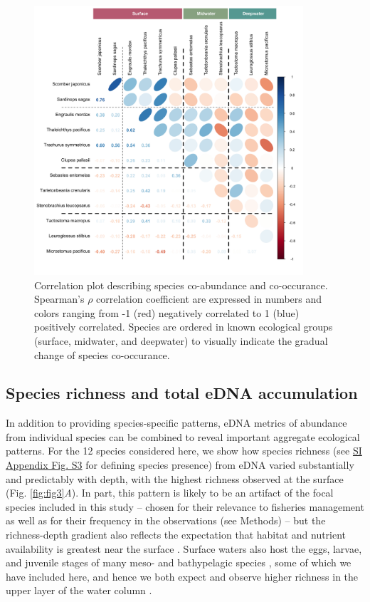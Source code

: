 \documentclass{article}
\begin{document}
\begin{figure}[tbhp] 
\centering
\includegraphics[width=10cm]{plots/2_Figure_2.jpg}  
\caption{Correlation plot describing species co-abundance and co-occurance. Spearman’s $\rho$ correlation coefficient are expressed in numbers and colors ranging from -1 (red) negatively correlated to 1 (blue) positively correlated. Species are ordered in known ecological groups (surface, midwater, and deepwater) to visually indicate the gradual change of species co-occurance.}
\label{fig:fig2}
\end{figure}

\subsection*{Species richness and total eDNA accumulation}
In addition to providing species-specific patterns, eDNA metrics of abundance from individual species can be combined to reveal important aggregate ecological patterns. For the 12 species considered here, we show how species richness (see \href{SI_Appendix.pdf}{SI Appendix Fig. S3} for defining species presence) from eDNA varied substantially and predictably with depth, with the highest richness observed at the surface (Fig. \ref{fig:fig3}\textit{A}). In part, this pattern is likely to be an artifact of the focal species included in this study -- chosen for their relevance to fisheries management as well as for their frequency in the observations (see Methods) -- but the richness-depth gradient also reflects the expectation that habitat and nutrient availability is greatest near the surface \cite{smith2002,hickey2005}. Surface waters also host the eggs, larvae, and juvenile stages of many meso- and bathypelagic species \cite{parnel2008}, some of which we have included here, and hence we both expect and observe higher richness in the upper layer of the water column \cite{kim2011}.
\end{document}
